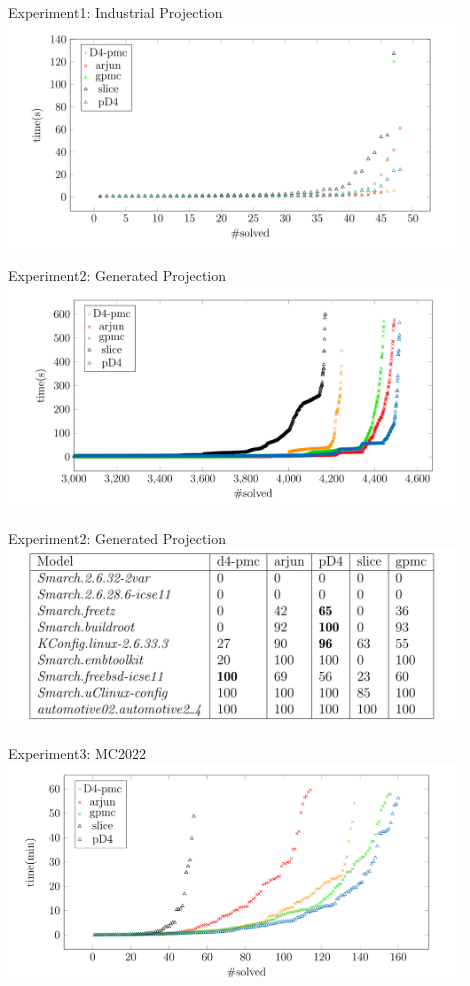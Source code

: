 \documentclass[
	aspectratio=169, %
	8pt, %
]{beamer}
\begin{document}
\begin{frame}{Experiment1: Industrial Projection}
    \centering
    \includegraphics[width=12cm]{exp1.png}
\end{frame}
\begin{frame}{Experiment2: Generated Projection}
    \centering
    \includegraphics[width=12cm]{exp2.png}
\end{frame}
\begin{frame}{Experiment2: Generated Projection}
    \centering
    \includegraphics[width=12cm]{exp2-table.png}
\end{frame}
\begin{frame}{Experiment3: MC2022}
    \centering
    \includegraphics[width=12cm]{exp3.png}
\end{frame}
\end{document}
